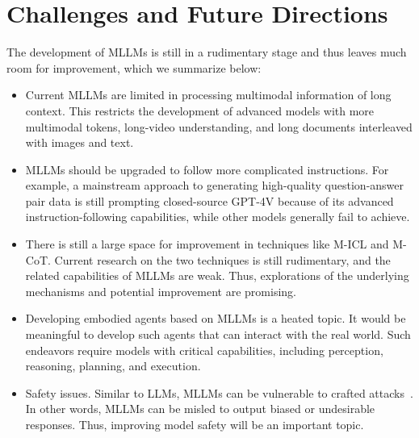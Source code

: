\section{Challenges and Future Directions}
\label{sec:future}


The development of MLLMs is still in a rudimentary stage and thus leaves much room for improvement, which we summarize below:


\begin{itemize}

\item Current MLLMs are limited in processing multimodal information of long context. This restricts the development of advanced models with more multimodal tokens, \eg long-video understanding, and long documents interleaved with images and text.

\item MLLMs should be upgraded to follow more complicated instructions. For example, a mainstream approach to generating high-quality question-answer pair data is still prompting closed-source GPT-4V because of its advanced instruction-following capabilities, while other models generally fail to achieve.

\item There is still a large space for improvement in techniques like M-ICL and M-CoT. Current research on the two techniques is still rudimentary, and the related capabilities of MLLMs are weak. Thus, explorations of the underlying mechanisms and potential improvement are promising.

\item Developing embodied agents based on MLLMs is a heated topic. It would be meaningful to develop such agents that can interact with the real world. Such endeavors require models with critical capabilities, including perception, reasoning, planning, and execution. 

\item Safety issues. Similar to LLMs, MLLMs can be vulnerable to crafted attacks~\cite{jeong2023hijacking,zhao2023evaluating,shayegani2023jailbreak}. In other words, MLLMs can be misled to output biased or undesirable responses. Thus, improving model safety will be an important topic.

\end{itemize}
